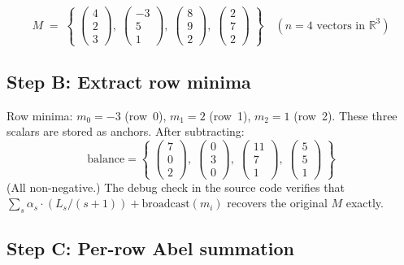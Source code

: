 \documentclass[11pt,a4paper]{article}
\newcommand{\R}{\mathbb{R}}
\begin{document}
\[
  M \;=\; \left\{\;
    \begin{pmatrix}4\\2\\3\end{pmatrix},\;
    \begin{pmatrix}-3\\5\\1\end{pmatrix},\;
    \begin{pmatrix}8\\9\\2\end{pmatrix},\;
    \begin{pmatrix}2\\7\\2\end{pmatrix}
  \;\right\}
  \quad (n=4 \text{ vectors in } \R^3)
\]

\subsection*{Step B: Extract row minima}

Row minima: $m_0 = -3$ (row~0), $m_1 = 2$ (row~1), $m_2 = 1$ (row~2).
These three scalars are stored as anchors.  After subtracting:
\[
  \text{balance} = \left\{\;
    \begin{pmatrix}7\\0\\2\end{pmatrix},\;
    \begin{pmatrix}0\\3\\0\end{pmatrix},\;
    \begin{pmatrix}11\\7\\1\end{pmatrix},\;
    \begin{pmatrix}5\\5\\1\end{pmatrix}
  \;\right\}
\]
(All non-negative.)  The debug check in the source code verifies that
$\sum_s \alpha_s \cdot (L_s/(s+1)) + \text{broadcast}(m_i)$ recovers
the original $M$ exactly.

\subsection*{Step C: Per-row Abel summation}
\end{document}
